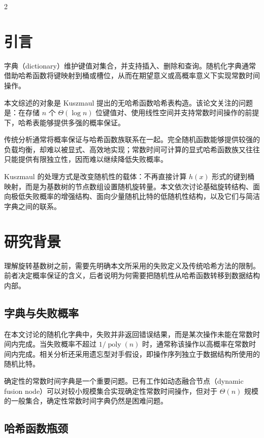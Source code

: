 \documentclass[10.5pt,compsoc,UTF8]{CjC}
\theoremstyle{mystyle}
\begin{document}
\vskip 1mm
\begin{multicols}{2}

\section{\heiti 引言}

字典（dictionary）维护键值对集合，并支持插入、删除和查询。随机化字典通常借助哈希函数将键映射到桶或槽位，从而在期望意义或高概率意义下实现常数时间操作。

本文综述的对象是 Kuszmaul 提出的无哈希函数哈希表构造\cite{kuszmaul2022hash}。该论文关注的问题是：在存储 $n$ 个 $\Theta(\log n)$ 位键值对、使用线性空间并支持常数时间操作的前提下，哈希表能够提供多强的概率保证。

传统分析通常将概率保证与哈希函数族联系在一起。完全随机函数能够提供较强的负载均衡，却难以被显式、高效地实现；常数时间可计算的显式哈希函数族又往往只能提供有限独立性，因而难以继续降低失败概率。

Kuszmaul 的处理方式是改变随机性的载体：不再直接计算 $h(x)$ 形式的键到桶映射，而是为基数树的节点数组设置随机旋转量。本文依次讨论基础旋转结构、面向极低失败概率的增强结构、面向少量随机比特的低随机性结构，以及它们与简洁字典之间的联系。

\section{\heiti 研究背景}

理解旋转基数树之前，需要先明确本文所采用的失败定义及传统哈希方法的限制。前者决定概率保证的含义，后者说明为何需要把随机性从哈希函数转移到数据结构内部。

\subsection{\heiti 字典与失败概率}

在本文讨论的随机化字典中，失败并非返回错误结果，而是某次操作未能在常数时间内完成。当失败概率不超过 $1/\operatorname{poly}(n)$ 时，通常称该操作以高概率在常数时间内完成。相关分析还采用遗忘型对手假设，即操作序列独立于数据结构所使用的随机比特。

确定性的常数时间字典是一个重要问题。已有工作如动态融合节点（dynamic fusion node）可以对较小规模集合实现确定性常数时间操作\cite{patrascu2014dynamic}，但对于 $\Theta(n)$ 规模的一般集合，确定性常数时间字典仍然是困难问题。

\subsection{\heiti 哈希函数瓶颈}


\end{multicols}
\end{document}
